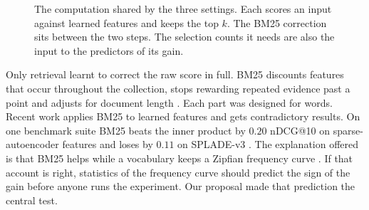 \documentclass[11pt]{article}
\begin{document}
\begin{figure}[t]
\centering
{}
\caption{The computation shared by the three settings. Each scores an input against
learned features and keeps the top $k$. The BM25 correction sits between
the two steps. The selection counts it needs are also the input to the predictors of
its gain.}
\label{fig:overview}
\end{figure}

Only retrieval learnt to correct the raw score in full. BM25 discounts features that occur
throughout the collection, stops rewarding repeated evidence past a point and adjusts
for document length \citep{sparckjones1972idf,robertson2009bm25}. Each part was designed
for words. Recent work applies BM25 to learned features and gets contradictory results.
On one benchmark suite BM25 beats the inner product by $0.20$ nDCG@10 on
sparse-autoencoder features and loses by $0.11$ on SPLADE-v3 \citep{clavie2026latent}.
The explanation offered is that BM25 helps while a vocabulary keeps a Zipfian frequency
curve \citep{clavie2026latent,han2026bm25v}. If that account is right, statistics of the
frequency curve should predict the sign of the gain before anyone runs the experiment.
Our proposal made that prediction the central test.
\end{document}
